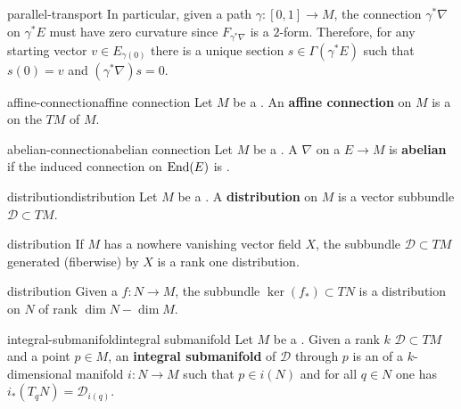 \begin{example}{parallel-transport}
    In particular, given a path $\gamma \colon [0, 1] \to M$, the connection $\gamma^* \nabla$ on $\gamma^* E$ must have zero curvature since $F_{\gamma^* \nabla}$ is a $2$-form. Therefore, for any starting vector $v \in E_{\gamma(0)}$ there is a unique section $s \in \Gamma(\gamma^* E)$ such that $s(0) = v$ and $(\gamma^* \nabla) s = 0$.
\end{example}

\begin{topic}{affine-connection}{affine connection}
    Let $M$ be a . An \textbf{affine connection} on $M$ is a  on the  $TM$ of $M$.
\end{topic}

\begin{topic}{abelian-connection}{abelian connection}
    Let $M$ be a . A  $\nabla$ on a  $E \to M$ is \textbf{abelian} if the induced connection on $\textup{End}(E)$ is .
\end{topic}

\begin{topic}{distribution}{distribution}
    Let $M$ be a . A \textbf{distribution} on $M$ is a vector subbundle $\mathcal{D} \subset TM$.
\end{topic}

\begin{example}{distribution}
    If $M$ has a nowhere vanishing vector field $X$, the subbundle $\mathcal{D} \subset TM$ generated (fiberwise) by $X$ is a rank one distribution.
\end{example}

\begin{example}{distribution}
    Given a  $f \colon N \to M$, the subbundle $\ker(f_*) \subset TN$ is a distribution on $N$ of rank $\dim N - \dim M$.
\end{example}

\begin{topic}{integral-submanifold}{integral submanifold}
    Let $M$ be a . Given a rank $k$  $\mathcal{D} \subset TM$ and a point $p \in M$, an \textbf{integral submanifold} of $\mathcal{D}$ through $p$ is an  of a $k$-dimensional manifold $i \colon N \to M$ such that $p \in i(N)$ and for all $q \in N$ one has $i_*(T_q N) = \mathcal{D}_{i(q)}$.
\end{topic}

